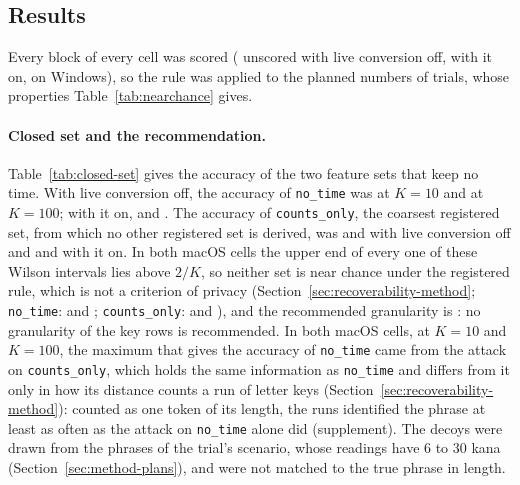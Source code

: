 \subsection{Results}
\label{sec:recoverability-results}

Every block of every cell was scored ( unscored with live conversion off,
 with it on,  on Windows), so the rule was
applied to the planned numbers of trials, whose properties Table~\ref{tab:nearchance} gives.

\paragraph{Closed set and the recommendation.} Table~\ref{tab:closed-set} gives the accuracy of the two feature sets
that keep no time. With live conversion off, the accuracy of \texttt{no\_time} was
 at $K = 10$ and  at
$K = 100$; with it on,  and
. The accuracy of \texttt{counts\_only}, the coarsest registered set,
from which no other registered set is derived, was  and
 with live conversion off and
 and  with it on.
In both macOS cells the upper end of every one of these Wilson intervals lies above $2/K$, so neither set is near chance
under the registered rule, which is not a criterion of privacy (Section~\ref{sec:recoverability-method};
\texttt{no\_time}:  and
; \texttt{counts\_only}: 
and ), and the recommended granularity is : no
granularity of the key rows is recommended. In both macOS cells, at $K = 10$ and $K = 100$, the
maximum that gives the accuracy of \texttt{no\_time} came from the attack on \texttt{counts\_only}, which holds the
same information as \texttt{no\_time} and differs from it only in how its distance counts a run of letter keys
(Section~\ref{sec:recoverability-method}): counted as one token of its length, the runs identified the phrase at least
as often as the attack on \texttt{no\_time} alone did (supplement). The decoys were drawn from the phrases of the
trial's scenario, whose readings have 6 to 30 kana (Section~\ref{sec:method-plans}), and were not matched to the true
phrase in length.


